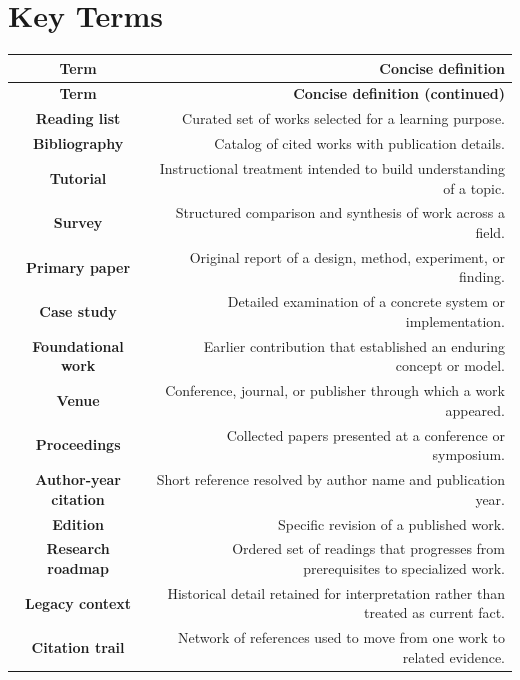 \documentclass[10pt,letterpaper]{article}
\begin{document}
\section*{Key Terms}
\small
\begin{longtable}{C N}
\color{white}\textbf{Term} & \color{white}\textbf{Concise definition}\\
\endfirsthead
{}\color{white}\textbf{Term} & \color{white}\textbf{Concise definition (continued)}\\
\endhead
\textbf{Reading list} & Curated set of works selected for a learning purpose.\\\hline
\textbf{Bibliography} & Catalog of cited works with publication details.\\\hline
\textbf{Tutorial} & Instructional treatment intended to build understanding of a topic.\\\hline
\textbf{Survey} & Structured comparison and synthesis of work across a field.\\\hline
\textbf{Primary paper} & Original report of a design, method, experiment, or finding.\\\hline
\textbf{Case study} & Detailed examination of a concrete system or implementation.\\\hline
\textbf{Foundational work} & Earlier contribution that established an enduring concept or model.\\\hline
\textbf{Venue} & Conference, journal, or publisher through which a work appeared.\\\hline
\textbf{Proceedings} & Collected papers presented at a conference or symposium.\\\hline
\textbf{Author-year citation} & Short reference resolved by author name and publication year.\\\hline
\textbf{Edition} & Specific revision of a published work.\\\hline
\textbf{Research roadmap} & Ordered set of readings that progresses from prerequisites to specialized work.\\\hline
\textbf{Legacy context} & Historical detail retained for interpretation rather than treated as current fact.\\\hline
\textbf{Citation trail} & Network of references used to move from one work to related evidence.\\\hline
\end{longtable}
\normalsize
\end{document}
